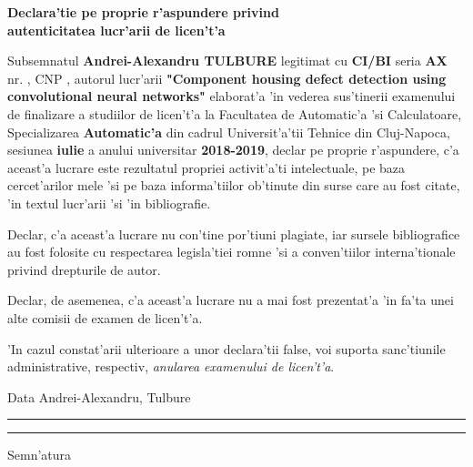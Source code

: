 \documentclass[12pt,a4paper,twoside]{report}
\newcommand{\uline}[1]{\rule[0pt]{#1}{0.4pt}}
\begin{document}
\begin{center}
{\bf
Declara'tie pe proprie r'aspundere privind\\ 
autenticitatea lucr'arii de licen't'a}
\end{center}
\vspace{1cm}



Subsemnatul 
 \textbf{Andrei-Alexandru TULBURE}
legitimat cu \textbf{CI/BI} seria \textbf{AX} nr. \textbf{}, CNP \textbf{}, autorul lucr'arii \textbf{"Component housing defect detection using convolutional neural networks"}
elaborat'a 'in vederea sus'tinerii examenului de finalizare a studiilor de licen't'a la Facultatea de Automatic'a 'si Calculatoare, Specializarea        \textbf{Automatic'a} din cadrul Universit'a'tii Tehnice din Cluj-Napoca, sesiunea \textbf{iulie} a anului universitar \textbf{2018-2019}, declar pe proprie r'aspundere, c'a aceast'a lucrare este rezultatul propriei activit'a'ti intelectuale, pe baza cercet'arilor mele 'si pe baza informa'tiilor ob'tinute din surse care au fost citate, 'in textul lucr'arii 'si 'in bibliografie.

Declar, c'a aceast'a lucrare nu con'tine por'tiuni plagiate, iar sursele bibliografice au fost folosite cu respectarea legisla'tiei rom\ia ne 'si a conven'tiilor interna'tionale privind drepturile de autor.

Declar, de asemenea, c'a aceast'a lucrare nu a mai fost prezentat'a 'in fa'ta unei alte comisii de examen de licen't'a.

'In cazul constat'arii ulterioare a unor declara'tii false, voi suporta sanc'tiunile administrative, respectiv, \emph{anularea examenului de licen't'a}.

\vspace{1.5cm}

Data \hspace{8cm} Andrei-Alexandru, Tulbure

\vspace{0.5cm}

\uline{3cm} \hspace{5cm} \uline{5cm}

\vspace{1cm}
\hspace{9.4cm}Semn'atura

\thispagestyle{empty}
\end{document}
